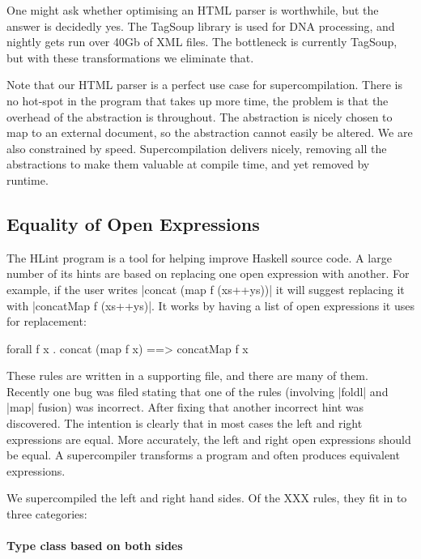 \documentclass[draft]{sigplanconf}
\newcommand{\unknown}{XXX}
\begin{document}
One might ask whether optimising an HTML parser is worthwhile, but the answer is decidedly yes. The TagSoup library is used for DNA processing, and nightly gets run over 40Gb of XML files. The bottleneck is currently TagSoup, but with these transformations we eliminate that.

Note that our HTML parser is a perfect use case for supercompilation. There is no hot-spot in the program that takes up more time, the problem is that the overhead of the abstraction is throughout. The abstraction is nicely chosen to map to an external document, so the abstraction cannot easily be altered. We are also constrained by speed. Supercompilation delivers nicely, removing all the abstractions to make them valuable at compile time, and yet removed by runtime.

\subsection{Equality of Open Expressions}
\label{sec:hlint}

The HLint program \cite{hlint} is a tool for helping improve Haskell source code. A large number of its hints are based on replacing one open expression with another. For example, if the user writes |concat (map f (xs++ys))| it will suggest replacing it with |concatMap f (xs++ys)|. It works by having a list of open expressions it uses for replacement:

\begin{code}
forall f x . concat (map f x) ==> concatMap f x
\end{code}

These rules are written in a supporting file, and there are many of them. Recently one bug was filed stating that one of the rules (involving |foldl| and |map| fusion) was incorrect. After fixing that another incorrect hint was discovered. The intention is clearly that in most cases the left and right expressions are equal. More accurately, the left and right open expressions should be equal. A supercompiler transforms a program and often produces equivalent expressions.

We supercompiled the left and right hand sides. Of the \unknown{} rules, they fit in to three categories:

\paragraph{Type class based on both sides}
\end{document}
